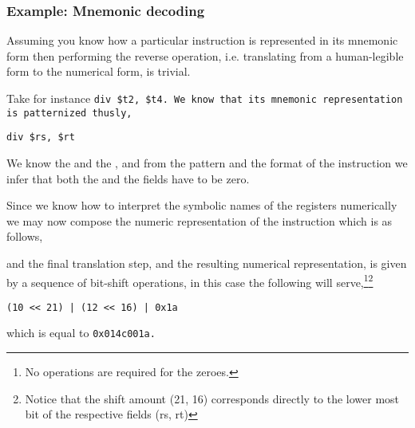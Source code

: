 \subsubsection{Example: Mnemonic decoding}

Assuming you know how a particular instruction is represented in its
mnemonic form then performing the reverse operation, i.e. translating from
a human-legible form to the numerical form, is trivial.

Take for instance \tt{div \$t2, \$t4}. We know that its mnemonic
representation is patternized thusly,

\begin{lstlisting}[style=mips_lst]
div $rs, $rt
\end{lstlisting}

We know the \opcode{} and the \funct{}, and from the pattern and the
format of the instruction we infer that both the \shamt{} and the
\rd{} fields have to be zero.

Since we know how to interpret the symbolic names of the registers
numerically we may now compose the numeric representation of the
instruction which is as follows,

\begin{figure}[H]
\end{figure}

and the final translation step, and the resulting numerical
representation, is given by a sequence of bit-shift operations, in
this case the following will serve,\footnote{No operations are
  required for the zeroes.}\footnote{Notice that the shift amount (21,
  16) corresponds directly to the lower most bit of the respective fields (rs, rt)}

\begin{lstlisting}
(10 << 21) | (12 << 16) | 0x1a
\end{lstlisting}

which is equal to \tt{0x014c001a}.
